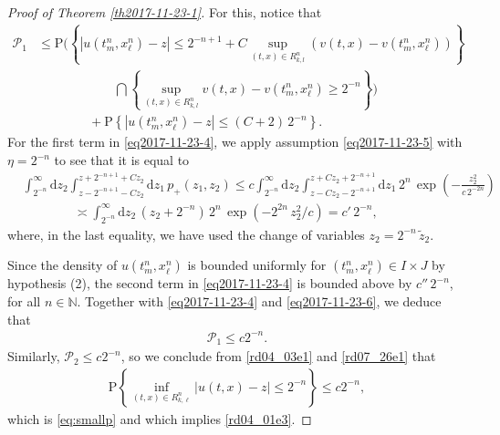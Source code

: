 \documentclass[12pt,a4paper]{article}
\newcommand{\N}{{\mathbb{N}}}
\renewcommand{\d}{\mathrm{d}}
\newcommand {\deltah}{{\zeta}}
\newcommand{\<}{\langle}
\renewcommand{\>}{\rangle}
\begin{document}
\begin{proof}[Proof of Theorem \ref{th2017-11-23-1}]
For this, notice that
\begin{align}
\mathcal{P}_1&\leq \mbox{P}\Bigg(\left\{|u(t_m^n, x_\ell^n) - z| \leq 2^{-n+1} + C \sup_{(t, x) \in R_{k, l}^n} (v(t, x) - v(t_m^n, x_\ell^n)) \right\} \nonumber \\
&\qquad \qquad\qquad \bigcap \left\{\sup_{(t, x) \in R_{k, l}^n}v(t, x) - v(t_m^n, x_\ell^n) \geq 2^{-n}\right\}\Bigg)\nonumber \\
& \qquad\qquad + \mbox{P}\left\{|u(t_m^n, x_\ell^n) - z| \leq (C+2)\, 2^{-n}\right\}. \label{eq2017-11-23-4}
\end{align}
For the first term in \eqref{eq2017-11-23-4}, we apply assumption \eqref{eq2017-11-23-5} with $\eta = 2^{-n}$
to see that it is equal to
\begin{align} \nonumber
& \int_{2^{-n}}^{\infty} \d z_2\int_{z - 2^{-n+1} - C z_2}^{z + 2^{-n+1} + C z_2} \d z_1\, p_+(z_1, z_2)   \leq c\int_{2^{-n}}^{\infty} \d z_2\int_{z - C z_2 - 2^{-n+1}}^{z + C z_2 + 2^{-n+1} }\d z_1 \, 2^{n}\, \exp\left(- \frac{z_2^2}{c\, 2^{-2n}}\right)  \\ 
 &\qquad\qquad \asymp \int_{2^{-n}}^{\infty} \d z_2\, (z_2 + 2^{-n}) \, 2^{n}\, \exp(- 2^{2n}\, z_2^2/c)= c'\, 2^{-n},
 \label{eq2017-11-23-6}
\end{align}
where, in the last equality, we have used the change of variables $z_2 = 2^{-n}\, \tilde{z}_2$.


Since the density of $u(t_m^n, x_\ell^n)$ is bounded uniformly for $(t_m^n, x_\ell^n) \in I \times J$ by hypothesis (2), the second term in \eqref{eq2017-11-23-4} is bounded above by $c'' \, 2^{-n}$, for all $n \in \N$. Together with \eqref{eq2017-11-23-4} and \eqref{eq2017-11-23-6}, we deduce that
\begin{align*}%
   \mathcal{P}_1 \leq c2^{-n}.
\end{align*}
Similarly, $\mathcal{P}_2 \leq c2^{-n}$, so we conclude from \eqref{rd04_03e1} and \eqref{rd07_26e1} that
\begin{align*}
\mbox{P}\left\{\inf_{(t, x) \in R_{k, \ell}^n}|u(t, x) - z| \leq 2^{-n}\right\} \leq c2^{-n},
\end{align*}
which is \eqref{eq:smallp} and which implies \eqref{rd04_01e3}.


\end{proof}
\end{document}
